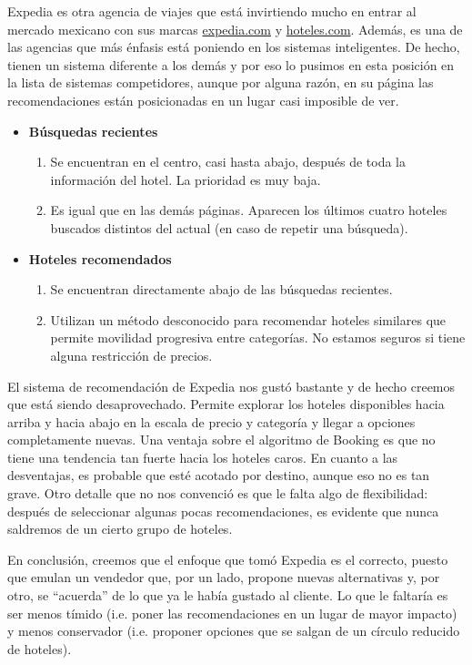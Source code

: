 \documentclass[12pt]{report}
\begin{document}
Expedia es otra agencia de viajes que está invirtiendo mucho en entrar al mercado mexicano con sus marcas \url{expedia.com} y \url{hoteles.com}. Además, es una de las agencias que más énfasis está poniendo en los sistemas inteligentes. De hecho, tienen un sistema diferente a los demás y por eso lo pusimos en esta posición en la lista de sistemas competidores, aunque por alguna razón, en su página las recomendaciones están posicionadas en un lugar casi imposible de ver. 
\begin{itemize}
	\item \textbf{Búsquedas recientes}
	\begin{enumerate}
		\item Se encuentran en el centro, casi hasta abajo, después de toda la información del hotel. La prioridad es muy baja.
		\item Es igual que en las demás páginas. Aparecen los últimos cuatro hoteles buscados distintos del actual (en caso de repetir una búsqueda).
	\end{enumerate}
	\item \textbf{Hoteles recomendados}
	\begin{enumerate}
		\item Se encuentran directamente abajo de las búsquedas recientes.
		\item Utilizan un método desconocido para recomendar hoteles similares que permite movilidad progresiva entre categorías. No estamos seguros si tiene alguna restricción de precios.
	\end{enumerate}
\end{itemize}
El sistema de recomendación de Expedia nos gustó bastante y de hecho creemos que está siendo desaprovechado. Permite explorar los hoteles disponibles hacia arriba y hacia abajo en la escala de precio y categoría y llegar a opciones completamente nuevas. Una ventaja sobre el algoritmo de Booking es que no tiene una tendencia tan fuerte hacia los hoteles caros. En cuanto a las desventajas, es probable que esté acotado por destino, aunque eso no es tan grave. Otro detalle que no nos convenció es que le falta algo de flexibilidad: después de seleccionar algunas pocas recomendaciones, es evidente que nunca saldremos de un cierto grupo de hoteles.

En conclusión, creemos que el enfoque que tomó Expedia es el correcto, puesto que emulan un vendedor que, por un lado, propone nuevas alternativas y, por otro, se ``acuerda'' de lo que ya le había gustado al cliente. Lo que le faltaría es ser menos tímido (i.e. poner las recomendaciones en un lugar de mayor impacto) y menos conservador (i.e. proponer opciones que se salgan de un círculo reducido de hoteles).
\end{document}
